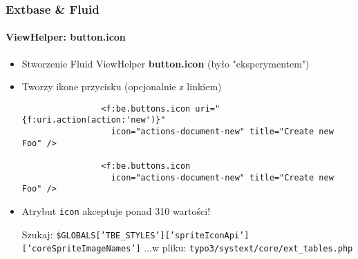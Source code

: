 \begin{frame}[fragile]
	\frametitle{Extbase \& Fluid}
	\framesubtitle{ViewHelper: button.icon}

	\lstset{
		basicstyle=\smaller\ttfamily
	}

	\begin{itemize}
		\item Stworzenie Fluid ViewHelper \textbf{button.icon} (było "eksperymentem")
		\item Tworzy ikone przycisku (opcjonalnie z linkiem)

			\begin{lstlisting}
				<f:be.buttons.icon uri="{f:uri.action(action:'new')}"
				  icon="actions-document-new" title="Create new Foo" />

				<f:be.buttons.icon
				  icon="actions-document-new" title="Create new Foo" />
			\end{lstlisting}

		\item Atrybut \texttt{icon} akceptuje ponad 310 wartości!\newline

			\smaller
				Szukaj:\newline
				\texttt{\$GLOBALS['TBE\_STYLES']['spriteIconApi']['coreSpriteImageNames']}\newline
				...w pliku:\newline
				\texttt{typo3/systext/core/ext\_tables.php}
			\normalsize

	\end{itemize}

\end{frame}


